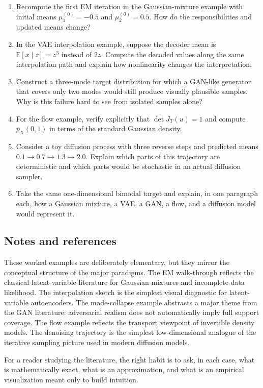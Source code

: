 \begin{enumerate}
    \item Recompute the first EM iteration in the Gaussian-mixture example with initial means $\mu_1^{(0)}=-0.5$ and $\mu_2^{(0)}=0.5$. How do the responsibilities and updated means change?
    \item In the VAE interpolation example, suppose the decoder mean is $\mathbb{E}[x\mid z]=z^3$ instead of $2z$. Compute the decoded values along the same interpolation path and explain how nonlinearity changes the interpretation.
    \item Construct a three-mode target distribution for which a GAN-like generator that covers only two modes would still produce visually plausible samples. Why is this failure hard to see from isolated samples alone?
    \item For the flow example, verify explicitly that $\det J_T(u)=1$ and compute $p_X(0,1)$ in terms of the standard Gaussian density.
    \item Consider a toy diffusion process with three reverse steps and predicted means $0.1\to 0.7\to 1.3\to 2.0$. Explain which parts of this trajectory are deterministic and which parts would be stochastic in an actual diffusion sampler.
    \item Take the same one-dimensional bimodal target and explain, in one paragraph each, how a Gaussian mixture, a VAE, a GAN, a flow, and a diffusion model would represent it.
\end{enumerate}

\subsection*{Notes and references}

These worked examples are deliberately elementary, but they mirror the conceptual structure of the major paradigms.
The EM walk-through reflects the classical latent-variable literature for Gaussian mixtures and incomplete-data likelihood.
The interpolation sketch is the simplest visual diagnostic for latent-variable autoencoders.
The mode-collapse example abstracts a major theme from the GAN literature: adversarial realism does not automatically imply full support coverage.
The flow example reflects the transport viewpoint of invertible density models.
The denoising trajectory is the simplest low-dimensional analogue of the iterative sampling picture used in modern diffusion models.

For a reader studying the literature, the right habit is to ask, in each case, what is mathematically exact, what is an approximation, and what is an empirical visualization meant only to build intuition.
